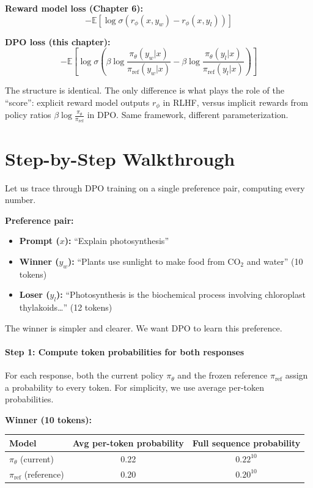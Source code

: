 \begin{chapterenv}
\begin{infobox}
\textbf{Reward model loss (Chapter 6):}
$$-\mathbb{E}\!\left[\log \sigma\!\left(r_\phi(x, y_w) - r_\phi(x, y_l)\right)\right]$$

\textbf{DPO loss (this chapter):}
$$-\mathbb{E}\!\left[\log \sigma\!\left(\beta \log \frac{\pi_\theta(y_w|x)}{\pi_{\text{ref}}(y_w|x)} - \beta \log \frac{\pi_\theta(y_l|x)}{\pi_{\text{ref}}(y_l|x)}\right)\right]$$

The structure is identical. The only difference is what plays the role of the ``score'': explicit reward model outputs $r_\phi$ in RLHF, versus implicit rewards from policy ratios $\beta \log \frac{\pi_\theta}{\pi_{\text{ref}}}$ in DPO. Same framework, different parameterization.
\end{infobox}

\section{Step-by-Step Walkthrough}

Let us trace through DPO training on a single preference pair, computing every number.

\textbf{Preference pair:}
\begin{itemize}[nosep]
    \item \textbf{Prompt ($x$):} ``Explain photosynthesis''
    \item \textbf{Winner ($y_w$):} ``Plants use sunlight to make food from CO$_2$ and water'' (10 tokens)
    \item \textbf{Loser ($y_l$):} ``Photosynthesis is the biochemical process involving chloroplast thylakoids\ldots'' (12 tokens)
\end{itemize}

The winner is simpler and clearer. We want DPO to learn this preference.

\paragraph{Step 1: Compute token probabilities for both responses}

For each response, both the current policy $\pi_\theta$ and the frozen reference $\pi_{\text{ref}}$ assign a probability to every token. For simplicity, we use average per-token probabilities.

\textbf{Winner (10 tokens):}

\begin{center}
\begin{tabular}{lcc}
\toprule
\textbf{Model} & \textbf{Avg per-token probability} & \textbf{Full sequence probability} \\
\midrule
$\pi_\theta$ (current) & 0.22 & $0.22^{10}$ \\
$\pi_{\text{ref}}$ (reference) & 0.20 & $0.20^{10}$ \\
\bottomrule
\end{tabular}
\end{center}


\end{chapterenv}
